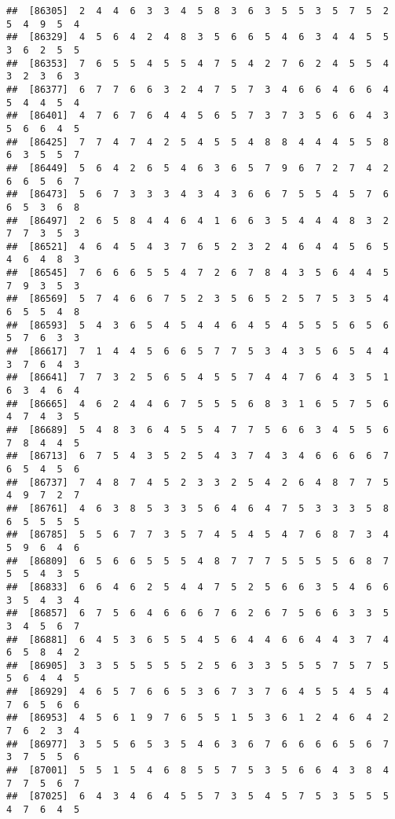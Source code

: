 \documentclass[
]{book}
\begin{document}
\begin{verbatim}
##  [86305]  2  4  4  6  3  3  4  5  8  3  6  3  5  5  3  5  7  5  2  5  4  9  5  4
##  [86329]  4  5  6  4  2  4  8  3  5  6  6  5  4  6  3  4  4  5  5  3  6  2  5  5
##  [86353]  7  6  5  5  4  5  5  4  7  5  4  2  7  6  2  4  5  5  4  3  2  3  6  3
##  [86377]  6  7  7  6  6  3  2  4  7  5  7  3  4  6  6  4  6  6  4  5  4  4  5  4
##  [86401]  4  7  6  7  6  4  4  5  6  5  7  3  7  3  5  6  6  4  3  5  6  6  4  5
##  [86425]  7  7  4  7  4  2  5  4  5  5  4  8  8  4  4  4  5  5  8  6  3  5  5  7
##  [86449]  5  6  4  2  6  5  4  6  3  6  5  7  9  6  7  2  7  4  2  6  6  5  6  7
##  [86473]  5  6  7  3  3  3  4  3  4  3  6  6  7  5  5  4  5  7  6  6  5  3  6  8
##  [86497]  2  6  5  8  4  4  6  4  1  6  6  3  5  4  4  4  8  3  2  7  7  3  5  3
##  [86521]  4  6  4  5  4  3  7  6  5  2  3  2  4  6  4  4  5  6  5  4  6  4  8  3
##  [86545]  7  6  6  6  5  5  4  7  2  6  7  8  4  3  5  6  4  4  5  7  9  3  5  3
##  [86569]  5  7  4  6  6  7  5  2  3  5  6  5  2  5  7  5  3  5  4  6  5  5  4  8
##  [86593]  5  4  3  6  5  4  5  4  4  6  4  5  4  5  5  5  6  5  6  5  7  6  3  3
##  [86617]  7  1  4  4  5  6  6  5  7  7  5  3  4  3  5  6  5  4  4  3  7  6  4  3
##  [86641]  7  7  3  2  5  6  5  4  5  5  7  4  4  7  6  4  3  5  1  6  3  4  6  4
##  [86665]  4  6  2  4  4  6  7  5  5  5  6  8  3  1  6  5  7  5  6  4  7  4  3  5
##  [86689]  5  4  8  3  6  4  5  5  4  7  7  5  6  6  3  4  5  5  6  7  8  4  4  5
##  [86713]  6  7  5  4  3  5  2  5  4  3  7  4  3  4  6  6  6  6  7  6  5  4  5  6
##  [86737]  7  4  8  7  4  5  2  3  3  2  5  4  2  6  4  8  7  7  5  4  9  7  2  7
##  [86761]  4  6  3  8  5  3  3  5  6  4  6  4  7  5  3  3  3  5  8  6  5  5  5  5
##  [86785]  5  5  6  7  7  3  5  7  4  5  4  5  4  7  6  8  7  3  4  5  9  6  4  6
##  [86809]  6  5  6  6  5  5  5  4  8  7  7  7  5  5  5  5  6  8  7  5  5  4  3  5
##  [86833]  6  6  4  6  2  5  4  4  7  5  2  5  6  6  3  5  4  6  6  3  5  4  3  4
##  [86857]  6  7  5  6  4  6  6  6  7  6  2  6  7  5  6  6  3  3  5  3  4  5  6  7
##  [86881]  6  4  5  3  6  5  5  4  5  6  4  4  6  6  4  4  3  7  4  6  5  8  4  2
##  [86905]  3  3  5  5  5  5  5  2  5  6  3  3  5  5  5  7  5  7  5  5  6  4  4  5
##  [86929]  4  6  5  7  6  6  5  3  6  7  3  7  6  4  5  5  4  5  4  7  6  5  6  6
##  [86953]  4  5  6  1  9  7  6  5  5  1  5  3  6  1  2  4  6  4  2  7  6  2  3  4
##  [86977]  3  5  5  6  5  3  5  4  6  3  6  7  6  6  6  6  5  6  7  3  7  5  5  6
##  [87001]  5  5  1  5  4  6  8  5  5  7  5  3  5  6  6  4  3  8  4  7  7  5  6  7
##  [87025]  6  4  3  4  6  4  5  5  7  3  5  4  5  7  5  3  5  5  5  4  7  6  4  5

\end{verbatim}
\end{document}
